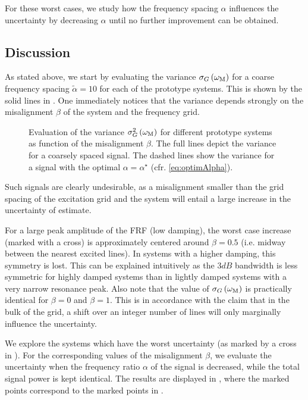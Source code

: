   For these worst cases, we study how the frequency spacing $\alpha$ influences the uncertainty by decreasing $\alpha$ until no further improvement can be obtained.

  \subsection{Discussion} \label{sec:bestFrequencyResolution}
  As stated above, we start by evaluating the variance $\sigma_G\left( \omega_{\mathrm{M}}\right)$ for a coarse frequency spacing $\tilde{\alpha} = 10$ for each of the prototype systems.
  This is shown by the solid lines in .
  One immediately notices that the variance depends strongly on the misalignment $\beta$ of the system and the frequency grid.
  
  \begin{figure}
    \centering
      \setlength\figureheight{5cm}
      \setlength{}
    
    \caption[Variance $\sigma_G^2\left( \wM \right)$ as a function of the grid misalignment coefficient $\beta$.]{Evaluation of the variance $\sigma_G^2\left( \wM \right) $ for different prototype systems as function of the misalignment $\beta$.
             The full lines depict the variance for a coarsely spaced signal.
             The dashed lines show the variance for a signal with the optimal $\alpha = \alpha^{\star}$ (cfr. \eqref{eq:optimAlpha}).}
    \label{fig:worstCaseBeta}
  \end{figure}

  Such signals are clearly undesirable, as a misalignment smaller than the grid spacing of the excitation grid and the system will entail a large increase in the uncertainty of estimate.
  
  For a large peak amplitude of the FRF (low damping), the worst case increase (marked with a cross) is approximately centered around $\beta = 0.5$ (i.e. midway between the nearest excited lines).
  In systems with a higher damping, this symmetry is lost.
  This can be explained intuitively as the $3\unit{dB}$ bandwidth is less symmetric for highly damped systems than in lightly damped systems with a very narrow resonance peak.
  Also note that the value of $\sigma_G\left(\omega_{\mathrm{M}} \right)$ is practically identical for $\beta=0$ and $\beta=1$.
  This is in accordance with the claim that in the bulk of the grid, a shift over an integer number of lines will only marginally influence the uncertainty.
  
  We explore the systems which have the worst uncertainty (as marked by a cross in ).
  For the corresponding values of the misalignment $\beta$, we evaluate the uncertainty when the frequency ratio $\alpha$ of the signal is decreased, while the total signal power is kept identical.
  The results are displayed in , where the marked points correspond to the marked points in .
  
